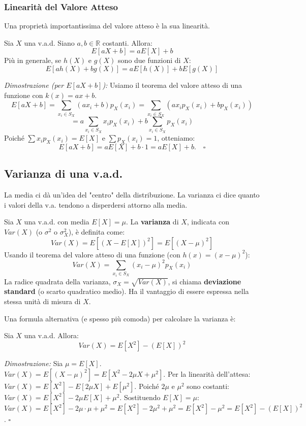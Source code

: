 \subsubsection{Linearità del Valore Atteso}
Una proprietà importantissima del valore atteso è la sua linearità.
\begin{theorem}
Sia $X$ una v.a.d. Siano $a, b \in \mathbb{R}$ costanti. Allora:
\[ E[aX + b] = aE[X] + b \]
Più in generale, se $h(X)$ e $g(X)$ sono due funzioni di $X$:
\[ E[a h(X) + b g(X)] = a E[h(X)] + b E[g(X)] \]
\end{theorem}
\textit{Dimostrazione (per $E[aX+b]$):}
Usiamo il teorema del valore atteso di una funzione con $k(x) = ax+b$.
\[ E[aX+b] = \sum_{x_i \in S_X} (ax_i+b) p_X(x_i) = \sum_{x_i \in S_X} (ax_i p_X(x_i) + b p_X(x_i)) \]
\[ = a \sum_{x_i \in S_X} x_i p_X(x_i) + b \sum_{x_i \in S_X} p_X(x_i) \]
Poiché $\sum x_i p_X(x_i) = E[X]$ e $\sum p_X(x_i) = 1$, otteniamo:
\[ E[aX+b] = aE[X] + b \cdot 1 = aE[X] + b. \quad \square \]

\subsection{Varianza di una v.a.d.}
La media ci dà un'idea del "centro" della distribuzione. La varianza ci dice quanto i valori della v.a. tendono a disperdersi attorno alla media.

\begin{definition}
Sia $X$ una v.a.d. con media $E[X]=\mu$. La \textbf{varianza} di $X$, indicata con $Var(X)$ (o $\sigma^2$ o $\sigma_X^2$), è definita come:
\[ Var(X) = E[(X - E[X])^2] = E[(X-\mu)^2] \]
Usando il teorema del valore atteso di una funzione (con $h(x)=(x-\mu)^2$):
\[ Var(X) = \sum_{x_i \in S_X} (x_i - \mu)^2 p_X(x_i) \]
La radice quadrata della varianza, $\sigma_X = \sqrt{Var(X)}$, si chiama \textbf{deviazione standard} (o scarto quadratico medio). Ha il vantaggio di essere espressa nella stessa unità di misura di $X$.
\end{definition}

Una formula alternativa (e spesso più comoda) per calcolare la varianza è:
\begin{theorem}
Sia $X$ una v.a.d. Allora:
\[ Var(X) = E[X^2] - (E[X])^2 \]
\end{theorem}
\textit{Dimostrazione:}
Sia $\mu = E[X]$.
$Var(X) = E[(X-\mu)^2] = E[X^2 - 2\mu X + \mu^2]$.
Per la linearità dell'attesa:
$Var(X) = E[X^2] - E[2\mu X] + E[\mu^2]$.
Poiché $2\mu$ e $\mu^2$ sono costanti:
$Var(X) = E[X^2] - 2\mu E[X] + \mu^2$.
Sostituendo $E[X]=\mu$:
$Var(X) = E[X^2] - 2\mu \cdot \mu + \mu^2 = E[X^2] - 2\mu^2 + \mu^2 = E[X^2] - \mu^2 = E[X^2] - (E[X])^2$. $\square$

